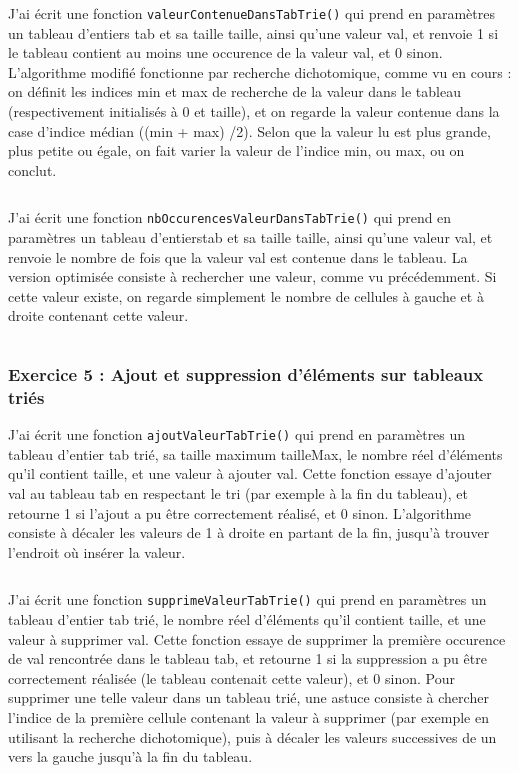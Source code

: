 J'ai écrit une fonction \texttt{valeurContenueDansTabTrie()} qui prend en paramètres un tableau d’entiers tab et sa taille taille, ainsi qu’une valeur val, et renvoie 1 si le tableau contient au moins une occurence de la valeur val, et 0 sinon. L’algorithme modifié fonctionne par recherche dichotomique, comme vu en cours : on définit les indices min et max de recherche de la valeur dans le tableau (respectivement initialisés à 0 et taille), et on regarde la valeur contenue dans la case d’indice médian ((min + max) /2). Selon que la valeur lu est plus grande, plus petite ou égale, on fait varier la valeur de l’indice min, ou max, ou on conclut.
\inputminted[linenos,firstline=7, lastline=22]{cpp}{../sources/cpp/TP1-2/manipTableauxTries.c}

J'ai écrit une fonction \texttt{nbOccurencesValeurDansTabTrie()} qui prend en paramètres un tableau d’entierstab et sa taille taille, ainsi qu’une valeur val, et renvoie le nombre de fois que la valeur val est contenue dans le tableau. La version optimisée consiste à rechercher une valeur, comme vu précédemment. Si cette valeur existe, on regarde simplement le nombre de cellules à gauche et à droite contenant cette valeur.
\inputminted[linenos,firstline=24, lastline=48]{cpp}{../sources/cpp/TP1-2/manipTableauxTries.c}

\subsubsection{Exercice 5 : Ajout et suppression d’éléments sur tableaux triés}

J'ai écrit une fonction \texttt{ajoutValeurTabTrie()} qui prend en paramètres un tableau d’entier tab trié, sa taille maximum tailleMax, le nombre réel d’éléments qu’il contient taille, et une valeur à ajouter val. Cette fonction essaye d’ajouter val au tableau tab en respectant le tri (par exemple à la fin du tableau), et retourne 1 si l’ajout a pu être correctement réalisé, et 0 sinon. L’algorithme consiste à décaler les valeurs de 1 à droite en partant de la fin, jusqu’à trouver l’endroit où insérer la valeur.
\inputminted[linenos,firstline=7, lastline=25]{cpp}{../sources/cpp/TP1-2/modifTableauxTries.c}

J'ai écrit une fonction \texttt{supprimeValeurTabTrie()} qui prend en paramètres un tableau d’entier tab trié, le nombre réel d’éléments qu’il contient taille, et une valeur à supprimer val. Cette fonction essaye de supprimer la première occurence de val rencontrée dans le tableau tab, et retourne 1 si la suppression a pu être correctement réalisée (le tableau contenait cette valeur), et 0 sinon. Pour supprimer une telle valeur dans un tableau trié, une astuce consiste à chercher l’indice de la première cellule contenant la valeur à supprimer (par exemple en utilisant la recherche dichotomique), puis à décaler les valeurs successives de un vers la gauche jusqu’à la fin du tableau.
\inputminted[linenos,firstline=27, lastline=46]{cpp}{../sources/cpp/TP1-2/modifTableauxTries.c}

